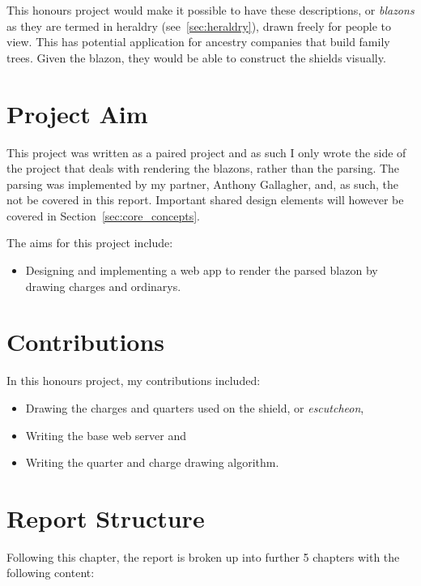 \documentclass[nobib, a4paper, twoside, justified]{tufte-book}
\makeatletter
\newcommand{\charge}{\gls{charge}\@\xspace}
\newcommand{\charges}{\glspl{charge}\@\xspace}
\newcommand{\quarter}{\gls{quarter}\@\xspace}
\newcommand{\quarters}{\glspl{quarter}\@\xspace}
\newcommand{\blazon}{\gls{blazon}\@\xspace}
\newcommand{\blazons}{\glspl{blazon}\@\xspace}
\makeatother
\begin{document}
This honours project would make it possible to have these descriptions, or \textit{\blazons} as
they are termed in heraldry (see~\ref{sec:heraldry}), drawn freely for people to view. This has
potential application for ancestry companies that build family trees. Given the
\blazon, they would be able to construct the shields visually.

\section{Project Aim}%
\label{sec:project_aim}

This project was written as a paired project and as such I only wrote the side of the project that
deals with rendering the \blazons, rather than the parsing. The parsing was implemented by my
partner, Anthony Gallagher, and, as such, the not be covered in this report.  Important shared
design elements will however be covered in Section~\ref{sec:core_concepts}.

The aims for this project include:

\begin{itemize}
  \item Designing and implementing a web app to render the parsed \blazon by drawing \charges and
    \glspl{ordinary}.
\end{itemize}

\section{Contributions}%
\label{sec:contributions}

In this honours project, my contributions included:

\begin{itemize}
  \item Drawing the \charges and \quarters used on the shield, or \textit{\gls{escutcheon}},
  \item Writing the base web server and
  \item Writing the \quarter and \charge drawing algorithm.
\end{itemize}

\section{Report Structure}%
\label{sec:report_structure}

Following this chapter, the report is broken up into further 5 chapters with the following content:
\end{document}
